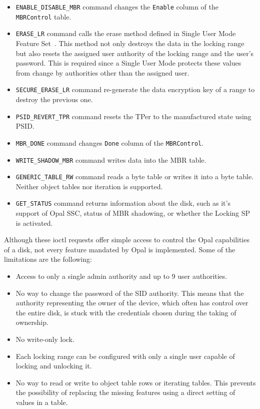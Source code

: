 \begin{itemize}
\item \verb|ENABLE_DISABLE_MBR| command changes the \verb|Enable| column of the \verb|MBRControl| table. %
\item \verb|ERASE_LR| command calls the erase method defined in Single User Mode Feature Set~\cite{tcg-sum}. This method not only destroys the data in the locking range but also resets the assigned user authority of the locking range and the user's password. This is required since a Single User Mode protects these values from change by authorities other than the assigned user.
\item \verb|SECURE_ERASE_LR| command re-generate the data encryption key of a range to destroy the previous one.
\item \verb|PSID_REVERT_TPR| command resets the TPer to the manufactured state using PSID.
\item \verb|MBR_DONE| command changes \verb|Done| column of the \verb|MBRControl|. %
\item \verb|WRITE_SHADOW_MBR| command writes data into the MBR table.
\item \verb|GENERIC_TABLE_RW| command reads a byte table or writes it into a byte table. Neither object tables nor iteration is supported.
\item \verb|GET_STATUS| command returns information about the disk, such as it's support of Opal SSC, status of MBR shadowing, or whether the Locking SP is activated.
\end{itemize}

Although these ioctl requests offer simple access to control the Opal capabilities of a disk, not every feature mandated by Opal is implemented. Some of the limitations are the following: 
\begin{itemize}
\item Access to only a single admin authority and up to 9 user authorities.
\item No way to change the password of the SID authority. This means that the authority representing the owner of the device, which often has control over the entire disk, is stuck with the credentials chosen during the taking of ownership. 
\item No write-only lock.
\item Each locking range can be configured with only a single user capable of locking and unlocking it.
\item No way to read or write to object table rows or iterating tables. This prevents the possibility of replacing the missing features using a direct setting of values in a table.
\end{itemize}

